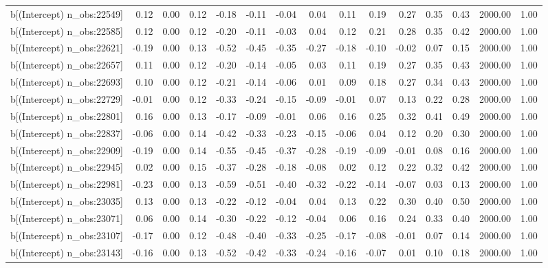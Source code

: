 \begin{table}[ht]
\begin{tabular}{rrrrrrrrrrrrrrr}
  b[(Intercept) n\_obs:22549] & 0.12 & 0.00 & 0.12 & -0.18 & -0.11 & -0.04 & 0.04 & 0.11 & 0.19 & 0.27 & 0.35 & 0.43 & 2000.00 & 1.00 \\ 
  b[(Intercept) n\_obs:22585] & 0.12 & 0.00 & 0.12 & -0.20 & -0.11 & -0.03 & 0.04 & 0.12 & 0.21 & 0.28 & 0.35 & 0.42 & 2000.00 & 1.00 \\ 
  b[(Intercept) n\_obs:22621] & -0.19 & 0.00 & 0.13 & -0.52 & -0.45 & -0.35 & -0.27 & -0.18 & -0.10 & -0.02 & 0.07 & 0.15 & 2000.00 & 1.00 \\ 
  b[(Intercept) n\_obs:22657] & 0.11 & 0.00 & 0.12 & -0.20 & -0.14 & -0.05 & 0.03 & 0.11 & 0.19 & 0.27 & 0.35 & 0.43 & 2000.00 & 1.00 \\ 
  b[(Intercept) n\_obs:22693] & 0.10 & 0.00 & 0.12 & -0.21 & -0.14 & -0.06 & 0.01 & 0.09 & 0.18 & 0.27 & 0.34 & 0.43 & 2000.00 & 1.00 \\ 
  b[(Intercept) n\_obs:22729] & -0.01 & 0.00 & 0.12 & -0.33 & -0.24 & -0.15 & -0.09 & -0.01 & 0.07 & 0.13 & 0.22 & 0.28 & 2000.00 & 1.00 \\ 
  b[(Intercept) n\_obs:22801] & 0.16 & 0.00 & 0.13 & -0.17 & -0.09 & -0.01 & 0.06 & 0.16 & 0.25 & 0.32 & 0.41 & 0.49 & 2000.00 & 1.00 \\ 
  b[(Intercept) n\_obs:22837] & -0.06 & 0.00 & 0.14 & -0.42 & -0.33 & -0.23 & -0.15 & -0.06 & 0.04 & 0.12 & 0.20 & 0.30 & 2000.00 & 1.00 \\ 
  b[(Intercept) n\_obs:22909] & -0.19 & 0.00 & 0.14 & -0.55 & -0.45 & -0.37 & -0.28 & -0.19 & -0.09 & -0.01 & 0.08 & 0.16 & 2000.00 & 1.00 \\ 
  b[(Intercept) n\_obs:22945] & 0.02 & 0.00 & 0.15 & -0.37 & -0.28 & -0.18 & -0.08 & 0.02 & 0.12 & 0.22 & 0.32 & 0.42 & 2000.00 & 1.00 \\ 
  b[(Intercept) n\_obs:22981] & -0.23 & 0.00 & 0.13 & -0.59 & -0.51 & -0.40 & -0.32 & -0.22 & -0.14 & -0.07 & 0.03 & 0.13 & 2000.00 & 1.00 \\ 
  b[(Intercept) n\_obs:23035] & 0.13 & 0.00 & 0.13 & -0.22 & -0.12 & -0.04 & 0.04 & 0.13 & 0.22 & 0.30 & 0.40 & 0.50 & 2000.00 & 1.00 \\ 
  b[(Intercept) n\_obs:23071] & 0.06 & 0.00 & 0.14 & -0.30 & -0.22 & -0.12 & -0.04 & 0.06 & 0.16 & 0.24 & 0.33 & 0.40 & 2000.00 & 1.00 \\ 
  b[(Intercept) n\_obs:23107] & -0.17 & 0.00 & 0.12 & -0.48 & -0.40 & -0.33 & -0.25 & -0.17 & -0.08 & -0.01 & 0.07 & 0.14 & 2000.00 & 1.00 \\ 
  b[(Intercept) n\_obs:23143] & -0.16 & 0.00 & 0.13 & -0.52 & -0.42 & -0.33 & -0.24 & -0.16 & -0.07 & 0.01 & 0.10 & 0.18 & 2000.00 & 1.00 \\ 

\end{tabular}
\end{table}
